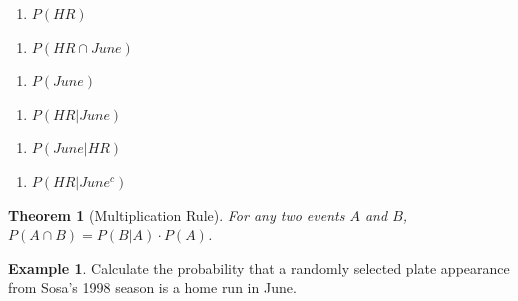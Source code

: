 \documentclass[
  11pt,
]{book}
\providecommand{\tightlist}{%
  \setlength{\itemsep}{0pt}\setlength{\parskip}{0pt}}
\newtheorem{theorem}{Theorem}[chapter]
\theoremstyle{definition}
\theoremstyle{definition}
\newtheorem{example}{Example}[chapter]
\theoremstyle{definition}
\theoremstyle{definition}
\theoremstyle{remark}
\begin{document}
\begin{enumerate}
\def\labelenumi{(\alph{enumi})}
\tightlist
\item
  \(P(HR)\)\\
\end{enumerate}

\vfill

\begin{enumerate}
\def\labelenumi{(\alph{enumi})}
\setcounter{enumi}{1}
\tightlist
\item
  \(P(HR \cap June)\)\\
\end{enumerate}

\vfill

\begin{enumerate}
\def\labelenumi{(\alph{enumi})}
\setcounter{enumi}{2}
\tightlist
\item
  \(P(June)\)\\
\end{enumerate}

\vfill

\begin{enumerate}
\def\labelenumi{(\alph{enumi})}
\setcounter{enumi}{3}
\tightlist
\item
  \(P(HR|June)\)\\
\end{enumerate}

\vfill

\begin{enumerate}
\def\labelenumi{(\alph{enumi})}
\setcounter{enumi}{4}
\tightlist
\item
  \(P(June|HR)\)\\
\end{enumerate}

\vfill

\begin{enumerate}
\def\labelenumi{(\alph{enumi})}
\setcounter{enumi}{5}
\tightlist
\item
  \(P(HR|June^c)\)\\
\end{enumerate}

\vfill

\newpage

\begin{theorem}[Multiplication Rule]
For any two events \(A\) and \(B\), \(P(A \cap B) = P(B|A) \cdot P(A)\).
\end{theorem}

\begin{example}
Calculate the probability that a randomly selected plate appearance from Sosa's 1998 season is a home run in June.
\end{example}
\end{document}
